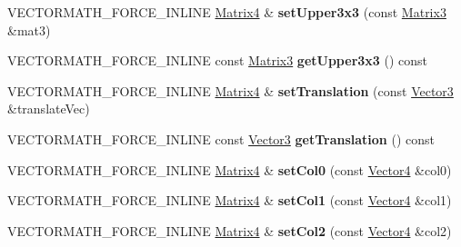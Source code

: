 \begin{DoxyCompactItemize}
V\+E\+C\+T\+O\+R\+M\+A\+T\+H\+\_\+\+F\+O\+R\+C\+E\+\_\+\+I\+N\+L\+I\+NE \hyperlink{classVectormath_1_1Aos_1_1Matrix4}{Matrix4} \& {\bfseries set\+Upper3x3} (const \hyperlink{classVectormath_1_1Aos_1_1Matrix3}{Matrix3} \&mat3)
\item 
\mbox{\label{classVectormath_1_1Aos_1_1Matrix4_a5395284a648385b1dd9a466b455bbcaf}} 
V\+E\+C\+T\+O\+R\+M\+A\+T\+H\+\_\+\+F\+O\+R\+C\+E\+\_\+\+I\+N\+L\+I\+NE const \hyperlink{classVectormath_1_1Aos_1_1Matrix3}{Matrix3} {\bfseries get\+Upper3x3} () const
\item 
\mbox{\label{classVectormath_1_1Aos_1_1Matrix4_afb83fc4a106bfdb32230e64e9375b35f}} 
V\+E\+C\+T\+O\+R\+M\+A\+T\+H\+\_\+\+F\+O\+R\+C\+E\+\_\+\+I\+N\+L\+I\+NE \hyperlink{classVectormath_1_1Aos_1_1Matrix4}{Matrix4} \& {\bfseries set\+Translation} (const \hyperlink{classVectormath_1_1Aos_1_1Vector3}{Vector3} \&translate\+Vec)
\item 
\mbox{\label{classVectormath_1_1Aos_1_1Matrix4_a049921b158219a1c88ae392356cf3674}} 
V\+E\+C\+T\+O\+R\+M\+A\+T\+H\+\_\+\+F\+O\+R\+C\+E\+\_\+\+I\+N\+L\+I\+NE const \hyperlink{classVectormath_1_1Aos_1_1Vector3}{Vector3} {\bfseries get\+Translation} () const
\item 
\mbox{\label{classVectormath_1_1Aos_1_1Matrix4_add6600aae59dfa0cd9bd58f2fe27d7c3}} 
V\+E\+C\+T\+O\+R\+M\+A\+T\+H\+\_\+\+F\+O\+R\+C\+E\+\_\+\+I\+N\+L\+I\+NE \hyperlink{classVectormath_1_1Aos_1_1Matrix4}{Matrix4} \& {\bfseries set\+Col0} (const \hyperlink{classVectormath_1_1Aos_1_1Vector4}{Vector4} \&col0)
\item 
\mbox{\label{classVectormath_1_1Aos_1_1Matrix4_a2367d8148278b125ceea6603743e2b43}} 
V\+E\+C\+T\+O\+R\+M\+A\+T\+H\+\_\+\+F\+O\+R\+C\+E\+\_\+\+I\+N\+L\+I\+NE \hyperlink{classVectormath_1_1Aos_1_1Matrix4}{Matrix4} \& {\bfseries set\+Col1} (const \hyperlink{classVectormath_1_1Aos_1_1Vector4}{Vector4} \&col1)
\item 
\mbox{\label{classVectormath_1_1Aos_1_1Matrix4_a03b79b4ed8e3e60649d42dfb5f62a273}} 
V\+E\+C\+T\+O\+R\+M\+A\+T\+H\+\_\+\+F\+O\+R\+C\+E\+\_\+\+I\+N\+L\+I\+NE \hyperlink{classVectormath_1_1Aos_1_1Matrix4}{Matrix4} \& {\bfseries set\+Col2} (const \hyperlink{classVectormath_1_1Aos_1_1Vector4}{Vector4} \&col2)

\end{DoxyCompactItemize}
